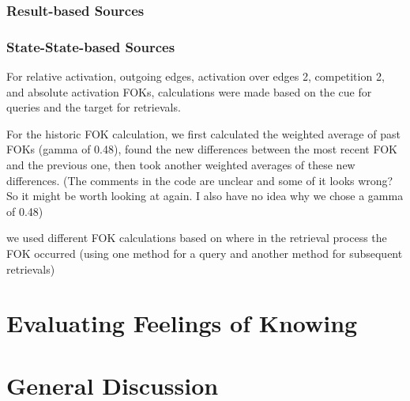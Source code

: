 \documentclass[10pt,letterpaper]{article}
\begin{document}
\subsubsection{Result-based Sources}

\subsubsection{State-State-based Sources}

For relative activation, outgoing edges, activation over edges 2, competition 2, and absolute activation FOKs, calculations were made based on the cue for queries and the target for retrievals.

For the historic FOK calculation, we first calculated the weighted average of past FOKs (gamma of 0.48), found the new differences between the most recent FOK and the previous one, then took another weighted averages of these new differences. (The comments in the code are unclear and some of it looks wrong? So it might be worth looking at again. I also have no idea why we chose a gamma of 0.48)

we used different FOK calculations based on where in the retrieval process the FOK occurred (using one method for a query and another method for subsequent retrievals)

\section{Evaluating Feelings of Knowing}


\section{General Discussion}


%



\setlength{\bibleftmargin}{.125in}
\setlength{\bibindent}{-\bibleftmargin}


\end{document}
